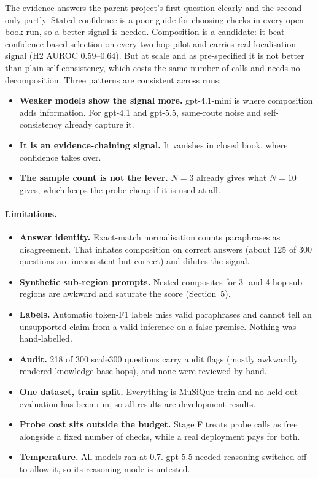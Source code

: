 \documentclass[11pt]{article}
\begin{document}
The evidence answers the parent project's first question clearly and the second only partly.
Stated confidence is a poor guide for choosing checks in every open-book run, so a better
signal is needed. Composition is a candidate: it beat confidence-based selection on every
two-hop pilot and carries real localisation signal (H2 AUROC 0.59--0.64). But at scale and
as pre-specified it is not better than plain self-consistency, which costs the same number
of calls and needs no decomposition. Three patterns are consistent across runs:
\begin{itemize}
  \item \textbf{Weaker models show the signal more.} gpt-4.1-mini is where composition adds
        information. For gpt-4.1 and gpt-5.5, same-route noise and self-consistency already
        capture it.
  \item \textbf{It is an evidence-chaining signal.} It vanishes in closed book, where
        confidence takes over.
  \item \textbf{The sample count is not the lever.} $N = 3$ already gives what $N = 10$
        gives, which keeps the probe cheap if it is used at all.
\end{itemize}

\paragraph{Limitations.}
\begin{itemize}
  \item \textbf{Answer identity.} Exact-match normalisation counts paraphrases as
        disagreement. That inflates composition on correct answers (about 125 of 300
        questions are inconsistent but correct) and dilutes the signal.
  \item \textbf{Synthetic sub-region prompts.} Nested composites for 3- and 4-hop sub-regions
        are awkward and saturate the score (Section~5).
  \item \textbf{Labels.} Automatic token-F1 labels miss valid paraphrases and cannot tell an
        unsupported claim from a valid inference on a false premise. Nothing was
        hand-labelled.
  \item \textbf{Audit.} 218 of 300 scale300 questions carry audit flags (mostly awkwardly
        rendered knowledge-base hops), and none were reviewed by hand.
  \item \textbf{One dataset, train split.} Everything is MuSiQue train and no held-out
        evaluation has been run, so all results are development results.
  \item \textbf{Probe cost sits outside the budget.} Stage F treats probe calls as free
        alongside a fixed number of checks, while a real deployment pays for both.
  \item \textbf{Temperature.} All models ran at 0.7. gpt-5.5 needed reasoning switched off
        to allow it, so its reasoning mode is untested.
\end{itemize}
\end{document}

